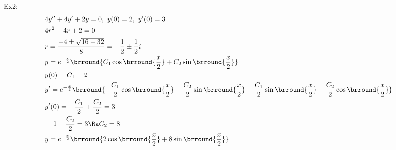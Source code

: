 Ex2:
\begin{align*}
    &4y''+4y'+2y=0,\ y(0)=2,\ y'(0)=3\\
    &4r^2+4r+2=0\\
    &r=\frac{-4\pm\sqrt{16-32}}{8}=-\frac{1}{2}\pm\frac{1}{2}i\\
    &y=e^{-\frac{x}{2}}\brround{C_1\cos\brround{\frac{x}{2}}+C_2\sin\brround{\frac{x}{2}}}\\
    &y(0)=C_1=2\\
    &y'=e^{-\frac{x}{2}}\brround{-\frac{C_1}{2}\cos\brround{\frac{x}{2}}-\frac{C_2}{2}\sin\brround{\frac{x}{2}}-\frac{C_1}{2}\sin\brround{\frac{x}{2}}+\frac{C_2}{2}\cos\brround{\frac{x}{2}}}\\
    &y'(0)=-\frac{C_1}{2}+\frac{C_2}{2}=3\\
    &-1+\frac{C_2}{2}=3\Ra C_2=8\\
    &y=e^{-\frac{x}{2}}\brround{2\cos\brround{\frac{x}{2}}+8\sin\brround{\frac{x}{2}}}
\end{align*}
